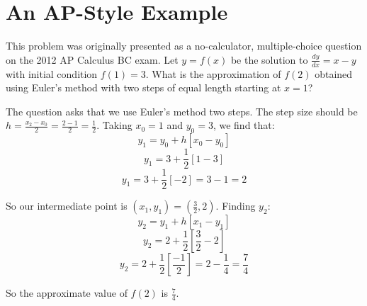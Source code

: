 \section{An AP-Style Example}

\begin{Worked}
\begin{Problem}
This problem was originally presented as a no-calculator,
multiple-choice question on the 2012 AP Calculus BC exam. Let $y = f(x)$ be 
the solution to $\frac{dy}{dx} = x - y$ with initial condition $f(1) = 3$. 
What is the approximation of $f(2)$ obtained using Euler's method with two 
steps of equal length starting at $x = 1$?
\end{Problem}
\begin{Solution}
The question asks that we use Euler's method two steps. The
step size should be $h = \frac{x_2 - x_0}{2} = \frac{2 - 1}{2} = \frac{1}{2}$. 
Taking $x_0 = 1$ and $y_0 = 3$, we find that:
$$y_1 = y_0 + h \left[x_0 - y_0 \right]$$
$$y_1 = 3 + \frac{1}{2} \left[1 - 3 \right]$$
$$y_1 = 3 + \frac{1}{2} \left[ -2 \right] = 3 - 1 = 2$$

So our intermediate point is $(x_1, y_1) = (\frac{3}{2}, 2)$. Finding $y_2$:
$$y_2 = y_1 + h \left[x_1 - y_1 \right]$$
$$y_2 = 2 + \frac{1}{2} \left[ \frac{3}{2} - 2 \right]$$
$$y_2 = 2 + \frac{1}{2} \left[\frac{-1}{2} \right] = 2 - \frac{1}{4} 
= \frac{7}{4}$$

So the approximate value of $f(2)$ is $\frac{7}{4}$.
\end{Solution}
\end{Worked}

